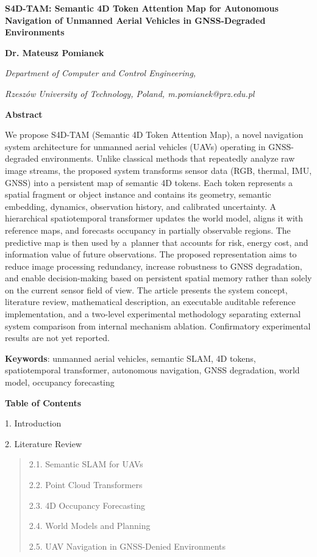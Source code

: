 \documentclass[
]{article}
\author{}
\date{}
\begin{document}
\textbf{S4D-TAM: Semantic 4D Token Attention Map for Autonomous
Navigation of Unmanned Aerial Vehicles in GNSS-Degraded Environments}

\textbf{Dr. Mateusz Pomianek}

\emph{Department of Computer and Control Engineering,}

\emph{Rzeszów University of Technology, Poland, m.pomianek@prz.edu.pl}

\textbf{Abstract}

We propose S4D-TAM (Semantic 4D Token Attention Map), a novel navigation
system architecture for unmanned aerial vehicles (UAVs) operating in
GNSS-degraded environments. Unlike classical methods that repeatedly
analyze raw image streams, the proposed system transforms sensor data
(RGB, thermal, IMU, GNSS) into a persistent map of semantic 4D tokens.
Each token represents a spatial fragment or object instance and contains
its geometry, semantic embedding, dynamics, observation history, and
calibrated uncertainty. A hierarchical spatiotemporal transformer
updates the world model, aligns it with reference maps, and forecasts
occupancy in partially observable regions. The predictive map is then
used by a~planner that accounts for risk, energy cost, and information
value of future observations. The proposed representation aims to reduce
image processing redundancy, increase robustness to GNSS degradation,
and enable decision-making based on persistent spatial memory rather
than solely on the current sensor field of view. The article presents
the system concept, literature review, mathematical description, an
executable auditable reference implementation, and a two-level
experimental methodology separating external system comparison from
internal mechanism ablation. Confirmatory experimental results are not
yet reported.

\textbf{Keywords}: unmanned aerial vehicles, semantic SLAM, 4D tokens,
spatiotemporal transformer, autonomous navigation, GNSS degradation,
world model, occupancy forecasting

\textbf{Table of Contents}

1. Introduction

2. Literature Review

\begin{quote}
2.1. Semantic SLAM for UAVs

2.2. Point Cloud Transformers

2.3. 4D Occupancy Forecasting

2.4. World Models and Planning

2.5. UAV Navigation in GNSS-Denied Environments
\end{quote}
\end{document}
